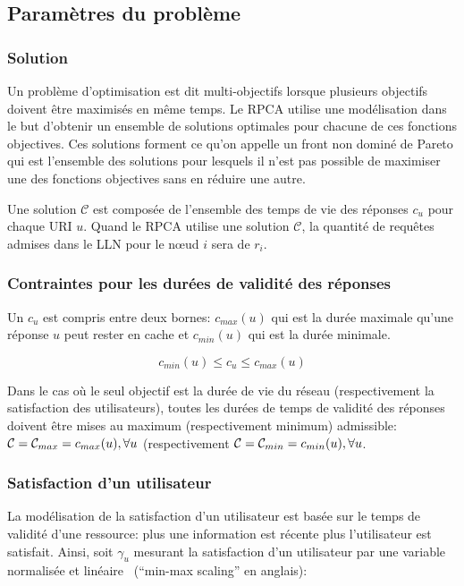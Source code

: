 \subsection{Paramètres du problème}

\subsubsection{Solution}

Un problème d'optimisation est dit multi-objectifs lorsque plusieurs objectifs doivent être maximisés en même temps.
Le \ac{RPCA} utilise une modélisation dans le but d'obtenir un ensemble de solutions optimales pour chacune de ces fonctions objectives.
Ces solutions forment ce qu'on appelle un front non dominé de Pareto qui est l'ensemble des solutions pour lesquels il n'est pas possible de maximiser une des fonctions objectives sans en réduire une autre.

Une solution $\mathcal{C}$ est composée de l'ensemble des temps de vie des réponses $c_u$ pour chaque \ac{URI} $u$.
Quand le \ac{RPCA} utilise une solution $\mathcal{C}$, la quantité de requêtes admises dans le \ac{LLN} pour le nœud $i$ sera de $r_i$.

\subsubsection{Contraintes pour les durées de validité des réponses}

Un $c_u$ est compris entre deux bornes: $c_{max}(u)$ qui est la durée maximale qu'une réponse $u$ peut rester en cache et $c_{min}(u)$ qui est la durée minimale.

\[ c_{min}(u) \leq c_u \leq c_{max}(u)\]

Dans le cas où le seul objectif est la durée de vie du réseau (respectivement la satisfaction des utilisateurs), toutes les durées de temps de validité des réponses doivent être mises au maximum (respectivement minimum) admissible: $\mathcal{C} = \mathcal{C}_{max} = c_{max}(u), \forall u$ (respectivement $\mathcal{C} = \mathcal{C}_{min} = c_{min}(u), \forall u$.

\subsubsection{Satisfaction d'un utilisateur}

La modélisation de la satisfaction d'un utilisateur est basée sur le temps de validité d'une ressource: plus une information est récente plus l'utilisateur est satisfait.
Ainsi, soit $\gamma_u$ mesurant la satisfaction d'un utilisateur par une variable normalisée et linéaire~\cite{harrington2012machine} (``min-max scaling'' en anglais):

